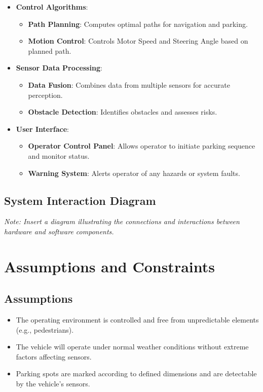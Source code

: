 \documentclass[12pt]{article}
\begin{document}
\begin{itemize}
    \item \textbf{Control Algorithms}:
    \begin{itemize}
        \item \textbf{Path Planning}: Computes optimal paths for navigation and parking.
        \item \textbf{Motion Control}: Controls Motor Speed and Steering Angle based on planned path.
    \end{itemize}
    \item \textbf{Sensor Data Processing}:
    \begin{itemize}
        \item \textbf{Data Fusion}: Combines data from multiple sensors for accurate perception.
        \item \textbf{Obstacle Detection}: Identifies obstacles and assesses risks.
    \end{itemize}
    \item \textbf{User Interface}:
    \begin{itemize}
        \item \textbf{Operator Control Panel}: Allows operator to initiate parking sequence and monitor status.
        \item \textbf{Warning System}: Alerts operator of any hazards or system faults.
    \end{itemize}
\end{itemize}

\subsection{System Interaction Diagram}

\textit{Note: Insert a diagram illustrating the connections and interactions between hardware and software components.}

\section{Assumptions and Constraints}

\subsection{Assumptions}

\begin{itemize}
    \item The operating environment is controlled and free from unpredictable elements (e.g., pedestrians).
    \item The vehicle will operate under normal weather conditions without extreme factors affecting sensors.
    \item Parking spots are marked according to defined dimensions and are detectable by the vehicle's sensors.
\end{itemize}
\end{document}
